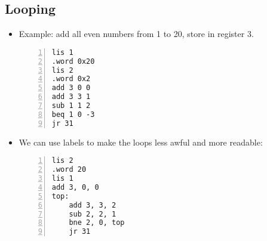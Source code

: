 \documentclass[12pt]{article}
\begin{document}
\subsection{Looping}
\begin{itemize}
    \item Example: add all even numbers from 1 to 20, store in register 3.
        \begin{lstlisting}[mathescape, numbers=left, breaklines=true]
lis 1
.word 0x20
lis 2
.word 0x2
add 3 0 0
add 3 3 1
sub 1 1 2
beq 1 0 -3
jr 31
        \end{lstlisting}
    \item We can use labels to make the loops less awful and more readable:
        \begin{lstlisting}[mathescape, numbers=left, breaklines=true]
lis 2
.word 20
lis 1
add 3, 0, 0
top:
    add 3, 3, 2
    sub 2, 2, 1
    bne 2, 0, top
    jr 31
        \end{lstlisting}        
\end{itemize}
\end{document}
